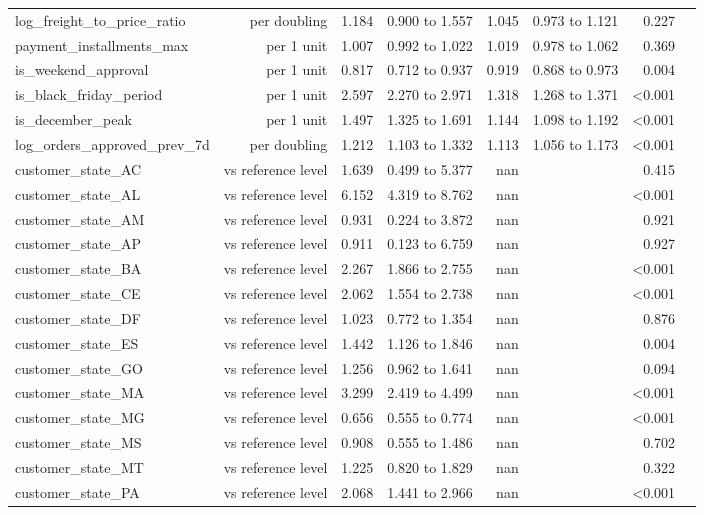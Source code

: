 \begin{table}[htbp]
\begin{tabular}{lrrrrrrr}
log\_freight\_to\_price\_ratio & per doubling & 1.184 & 0.900 to 1.557 & 1.045 & 0.973 to 1.121 & 0.227 &  \\
payment\_installments\_max & per 1 unit & 1.007 & 0.992 to 1.022 & 1.019 & 0.978 to 1.062 & 0.369 &  \\
is\_weekend\_approval & per 1 unit & 0.817 & 0.712 to 0.937 & 0.919 & 0.868 to 0.973 & 0.004 &  \\
is\_black\_friday\_period & per 1 unit & 2.597 & 2.270 to 2.971 & 1.318 & 1.268 to 1.371 & <0.001 &  \\
is\_december\_peak & per 1 unit & 1.497 & 1.325 to 1.691 & 1.144 & 1.098 to 1.192 & <0.001 &  \\
log\_orders\_approved\_prev\_7d & per doubling & 1.212 & 1.103 to 1.332 & 1.113 & 1.056 to 1.173 & <0.001 &  \\
customer\_state\_AC & vs reference level & 1.639 & 0.499 to 5.377 & nan &  & 0.415 &  \\
customer\_state\_AL & vs reference level & 6.152 & 4.319 to 8.762 & nan &  & <0.001 &  \\
customer\_state\_AM & vs reference level & 0.931 & 0.224 to 3.872 & nan &  & 0.921 &  \\
customer\_state\_AP & vs reference level & 0.911 & 0.123 to 6.759 & nan &  & 0.927 &  \\
customer\_state\_BA & vs reference level & 2.267 & 1.866 to 2.755 & nan &  & <0.001 &  \\
customer\_state\_CE & vs reference level & 2.062 & 1.554 to 2.738 & nan &  & <0.001 &  \\
customer\_state\_DF & vs reference level & 1.023 & 0.772 to 1.354 & nan &  & 0.876 &  \\
customer\_state\_ES & vs reference level & 1.442 & 1.126 to 1.846 & nan &  & 0.004 &  \\
customer\_state\_GO & vs reference level & 1.256 & 0.962 to 1.641 & nan &  & 0.094 &  \\
customer\_state\_MA & vs reference level & 3.299 & 2.419 to 4.499 & nan &  & <0.001 &  \\
customer\_state\_MG & vs reference level & 0.656 & 0.555 to 0.774 & nan &  & <0.001 &  \\
customer\_state\_MS & vs reference level & 0.908 & 0.555 to 1.486 & nan &  & 0.702 &  \\
customer\_state\_MT & vs reference level & 1.225 & 0.820 to 1.829 & nan &  & 0.322 &  \\
customer\_state\_PA & vs reference level & 2.068 & 1.441 to 2.966 & nan &  & <0.001 &  \\

\end{tabular}
\end{table}
